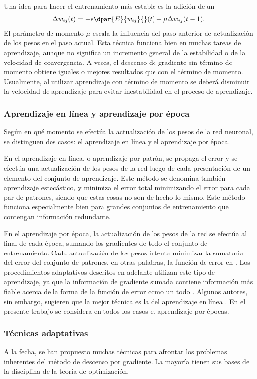 Una idea para hacer el entrenamiento más estable es la adición de un
%
\begin{align}\label{mlp8}
  \Delta w_{ij}(t) = - \epsilon \dpar{E}{w_{ij}}{}(t)
    + \mu \Delta w_{ij}(t-1).
\end{align}
%
El parámetro de momento $\mu$ escala la influencia del paso anterior
de actualización de los pesos en el paso actual. Esta técnica funciona
bien en muchas tareas de aprendizaje, aunque no significa un
incremento general de la estabilidad o de la velocidad de
convergencia.  A veces, el descenso de gradiente sin término de
momento obtiene iguales o mejores resultados que con el término de
momento. Usualmente, al utilizar aprendizaje con término de momento se
deberá disminuir la velocidad de aprendizaje para evitar inestabilidad
en el proceso de aprendizaje.
%
\subsubsection{Aprendizaje en línea y aprendizaje por época}
%
Según en qué momento se efectúa la actualización de los pesos de la
red neuronal, se distinguen dos casos: el aprendizaje en línea y el
aprendizaje por época.

En el aprendizaje en línea, o aprendizaje por patrón, se
propaga el error y se efectúa una actualización de los pesos de la red
luego de cada
presentación de un elemento del conjunto de aprendizaje.
Este método se denomina también aprendizaje
estocástico, y minimiza el error total
minimizando el error para cada par de patrones, siendo que estas cosas
no son de hecho lo mismo. Este método funciona especialmente bien para
grandes conjuntos de entrenamiento que contengan información
redundante.

En el aprendizaje por época, la actualización de los pesos de la red
se efectúa al final de cada época, 
sumando los gradientes de todo el conjunto de entrenamiento.  Cada
actualización de los pesos intenta minimizar la sumatoria del error
del conjunto de patrones, en otras palabras, la función de error en
. Los procedimientos adaptativos descritos en adelante
utilizan este tipo de aprendizaje, ya que la información de gradiente
sumada contiene información más fiable acerca de la forma de la
función de error como un todo \cite{riedmiller}.  Algunos autores, sin
embargo, sugieren que la mejor técnica es la del aprendizaje en línea
\cite{haykin}.
En el presente trabajo se considera en todos los casos el aprendizaje
por épocas.
%
\subsubsection{Técnicas adaptativas}
%
A la fecha, se han propuesto muchas técnicas para afrontar los
problemas inherentes del método de descenso por gradiente. La mayoría
tienen sus bases de la disciplina de la teoría de
optimización.

